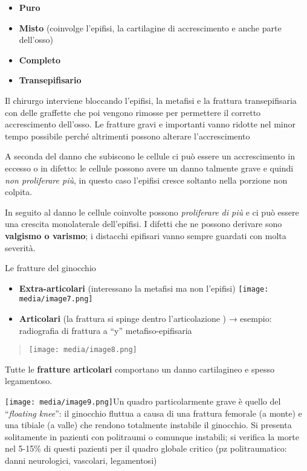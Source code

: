 \documentclass[]{article}
\begin{document}
\begin{itemize}
\item
  \textbf{Puro }
\item
  \textbf{Misto} (coinvolge l'epifisi, la cartilagine di accrescimento e
  anche parte dell'osso)
\item
  \textbf{Completo }
\item
  \textbf{Transepifisario}
\end{itemize}

Il chirurgo interviene bloccando l'epifisi, la metafisi e la frattura
transepifisaria con delle graffette che poi vengono rimosse per
permettere il corretto accrescimento dell'osso. Le fratture gravi e
importanti vanno ridotte nel minor tempo possibile perché altrimenti
possono alterare l'accrescimento

A seconda del danno che subiscono le cellule ci può essere un
accrescimento in eccesso o in difetto: le cellule possono avere un danno
talmente grave e quindi \emph{non proliferare più}, in questo caso
l'epifisi cresce soltanto nella porzione non colpita.

In seguito al danno le cellule coinvolte possono \emph{proliferare di
più} e ci può essere una crescita monolaterale dell'epifisi. I difetti
che ne possono derivare sono \textbf{valgismo o varismo}; i distacchi
epifisari vanno sempre guardati con molta severità.

Le fratture del ginocchio

\begin{itemize}
\item
  \textbf{Extra-articolari} (interessano la metafisi ma non l'epifisi)
  \texttt{[image: media/image7.png]}
\item
  \textbf{Articolari} (la frattura si spinge dentro l'articolazione ) →
  esempio: radiografia di frattura a ``y'' metafiso-epifisaria
\end{itemize}

\begin{quote}
\texttt{[image: media/image8.png]}
\end{quote}

Tutte le \textbf{fratture articolari} comportano un danno cartilagineo e
spesso legamentoso.

\texttt{[image: media/image9.png]}Un
quadro particolarmente grave è quello del ``\emph{floating knee}'': il
ginocchio fluttua a causa di una frattura femorale (a monte) e una
tibiale (a valle) che rendono totalmente instabile il ginocchio. Si
presenta solitamente in pazienti con politraumi o comunque instabili; si
verifica la morte nel 5-15\% di questi pazienti per il quadro globale
critico (pz politraumatico: danni neurologici, vascolari, legamentosi)
\end{document}
